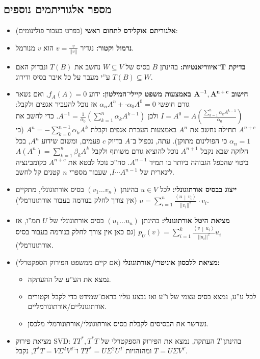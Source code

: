 \documentclass[a4paper]{article}
\newcommand\ra    {\rangle}
\newcommand\la    {\langle}
\newcommand\sumnko    {\sum_{k = 1}^{n}}
\newcommand\sumnio    {\sum_{i = 1}^{n}}
\newcommand\norm[1]   {\left \vert \left \vert #1 \right \vert \right \vert}
\newcommand\mut [2]   {\left \la #1 \,\middle|\, #2 \right \ra}
\newcommand\ag        {\alpha}
\newcommand\bg        {\beta}
\newcommand\Sg        {\Sigma}
\newcommand\op    {^{-1}}
\newcommand\cl [1]    {\left ( #1 \right )}
\theoremstyle{definition}
\begin{document}
	\subsection{מספר אלגוריתמים נוספים}
	\begin{itemize}
		\item \textbf{אלגוריתם אוקלידס לתחום ראשי} (בפרט בעבור פולינומים): 
		\item \textbf{נרמול וקטור: }נגדיר $v = \frac{v}{\norm{v}}$ הוא $v$ מנורמל. 
		\item \textbf{בדיקת $\bm{T}$־איווריאנטיות: }בהינתן $B$ בסיס של $W \subseteq V$ נחשב את $T(B)$ ונבדוק האם $T(B) \subseteq W$ ע''י מעבר על כל איבר בסיס ודירוג. 
		\item \textbf{חישוב $\bm{A\op, A^{n + c}}$ באמצעות משפט קיילי־המילטון: }ידוע $f_A(A) = 0$, ואם נשאר גורם חופשי $\ag_nA^{n} + \cdot \ag_0 A^{0} = 0$ אז נוכל להעביר אגפים ולקבל: $I = A^0 = A\cl{\frac{\sum_{k = 1}^{n}\ag_kA^{k - 1}}{\ag_0}}$ ולכן $A\op = \frac{1}{\ag_0}\cl{\sumnko \ag_k A^{k - 1}}$. כדי לחשב את $A^{n + c}$ תחילה נחשב את $A^{n}$ באמצעות העברת אגפים וקבלת $A^{n} = -\sum_{k = 0}^{n - 1} \ag_kA^{k}$ (כי $\ag_n = 1$ כי הפולינום מתוקן). עתה, נכפול ב־$A$ בדיוק $c$ פעמים, ומשום שידוע $A^{n}$, בכל חלוקה שבא נקבל $A^{n + 1}$ נוכל להוציא גורם משותף ולקבל $A(A^{n}) = \sumnko \bg_kA^{k}$ ביטוי שהכפל הגבוהה ביותר בו תמיד $A^{n - 1}$. סה''כ נוכל לבטא את $A^{n + c}$ כקומבינציה לינארית של $I \cdots A^{n - 1}$, שעבור מספרי $n$ קטנים קל לחשב. 
		\item \textbf{ייצוג בבסיס אורתוגונלי: }לכל $u \in V$ בהינתן $(v_1 \dots v_n)$ בסיס אורתוגונלי, מתקיים $u = \sumnio \frac{\mut{u}{v_i}}{\norm{v_i}^{2}} \cdot v_i$ (אין צורך לחלק בנורמה בעבור אורתונורמלי). 
		\item \textbf{מציאת היטל אורתוגונלי: }בהינתן $(u_1 \dots u_n)$ בסיס אורתוגונלי של $U$ תמ''ו, אז $p_U(v) = \sum_{i = 1}^{k}\frac{\mut{v}{u_i}}{\norm{u_i}^2}u_i$ (גם כאן אין צורך לחלק בנורמה בעבור בסיס אורתונורמלי). 
		\item \textbf{מציאת ללכסון אוניטרי/אורתוגונלי} (אם קיים ממשפט הפירוק הספקטרלי)\textbf{: }
		\begin{itemize}
			\item נמצא את הע''ע של ההעתקה. 
			\item לכל ע''ע, נמצא בסיס עצמי של ו''ע ואז נבצע עליו בראם־שמידט כדי לקבל וקטורים אורתוגונליים/אורתונורמליים. 
			\item נשרשר את הבסיסים לקבלת בסיס אורתוגונלי/אורתונורמלי מלכסן. 
		\end{itemize}
		\item מציאת פירוק SVD: בהינתן $T$ העתקה, נמצא את הפירוק הספקטרלי של $TT^*, T^*T$ ומהזהויות		 $TT^* = U\Sg^2U^{T}$ ו־$T^*T = V\Sg^2 V^{T}$, נקבל $T = U\Sg V^{T}$. 
	\end{itemize}
	
\end{document}
